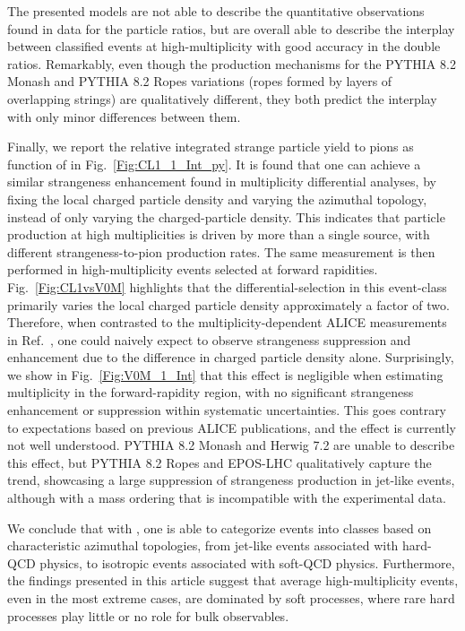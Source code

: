 The presented models are not able to describe the quantitative observations found in data for the particle ratios, but are overall able to describe the interplay between \SOPT classified events at high-multiplicity with good accuracy in the double ratios. Remarkably, even though the production mechanisms for the PYTHIA 8.2 Monash and PYTHIA 8.2 Ropes variations (ropes formed by layers of overlapping strings) are qualitatively different, they both predict the interplay with only minor differences between them. 

Finally, we report the relative integrated strange particle yield to pions as function of \SOPT in Fig.~\ref{Fig:CL1_1_Int_py}. It is found that one can achieve a similar strangeness enhancement found in multiplicity differential analyses, by fixing the local charged particle density and varying the azimuthal topology, instead of only varying the charged-particle density. This indicates that particle production at high multiplicities is driven by more than a single source, with different strangeness-to-pion production rates. The same measurement is then performed in high-multiplicity events selected at forward rapidities. Fig.~\ref{Fig:CL1vsV0M} highlights that the differential-\SOPT selection in this event-class primarily varies the local charged particle density approximately a factor of two. Therefore, when contrasted to the multiplicity-dependent ALICE measurements in Ref.~\cite{Naturepaper}, one could naively expect to observe strangeness suppression and enhancement due to the difference in charged particle density alone. Surprisingly, we show in Fig.~\ref{Fig:V0M_1_Int} that this effect is negligible when estimating multiplicity in the forward-rapidity region, with no significant strangeness enhancement or suppression within systematic uncertainties. This goes contrary to expectations based on previous ALICE publications, and the effect is currently not well understood. PYTHIA 8.2 Monash and Herwig 7.2 are unable to describe this effect, but PYTHIA 8.2 Ropes and EPOS-LHC qualitatively capture the trend, showcasing a large suppression of strangeness production in jet-like events, although with a mass ordering that is incompatible with the experimental data. 

We conclude that with \SOPT, one is able to categorize events into classes based on characteristic azimuthal topologies, from jet-like events associated with hard-QCD physics, to isotropic events associated with soft-QCD physics. Furthermore, the findings presented in this article suggest that average high-multiplicity events, even in the most extreme cases, are dominated by soft processes, where rare hard processes play little or no role for bulk observables.

